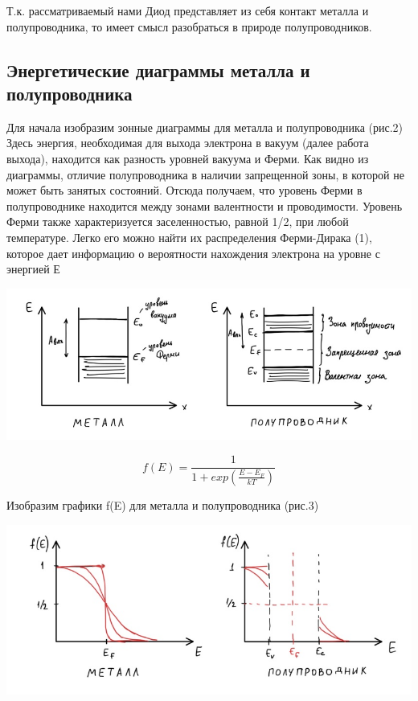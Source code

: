 \documentclass[a4paper]{article}
\begin{document}
Т.к. рассматриваемый нами Диод представляет из себя контакт металла и полупроводника, то имеет смысл разобраться в природе полупроводников.

\subsection*{Энергетические диаграммы металла и полупроводника}
Для начала изобразим зонные диаграммы для металла и полупроводника (рис.2)
Здесь энергия, необходимая для выхода электрона в вакуум (далее работа выхода), находится как разность уровней вакуума и Ферми. Как видно из диаграммы, отличие полупроводника в наличии запрещенной зоны, в которой не может быть занятых состояний. Отсюда получаем, что уровень Ферми в полупроводнике находится между зонами валентности и проводимости.
Уровень Ферми также характеризуется заселенностью, равной 1/2, при любой температуре. Легко его можно найти их распределения Ферми-Дирака (1), которое дает информацию о вероятности нахождения электрона на уровне с энергией Е

\begin{center}
    \includegraphics[scale = 0.7]{zonn_diag.jpg}
\end{center}

\begin{equation}
	f(E) = \frac{1}{1+exp(\frac{E-E_{F}}{kT})} 
\end{equation}

Изобразим графики f(E) для металла и полупроводника (рис.3)

\begin{center}
    \includegraphics[scale = 0.7]{Ferm-Dir.jpg}
\end{center}
\end{document}
